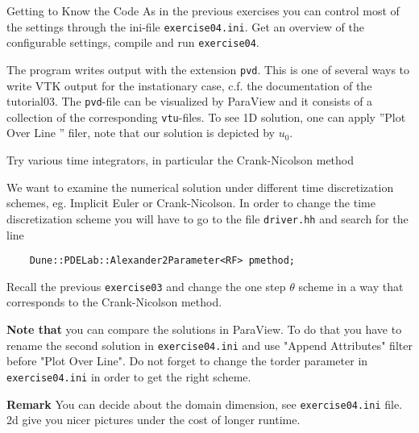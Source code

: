\documentclass[12pt,a4paper]{article}
\begin{document}
\begin{Exercise}{Getting to Know the Code}
  As in the previous exercises you can control most of the settings
  through the ini-file \lstinline!exercise04.ini!. Get an overview of
  the configurable settings, compile and run \lstinline!exercise04!.

  The program writes output with the extension \lstinline!pvd!. This is one
  of several ways to write VTK output for the instationary case,
  c.f. the documentation of the tutorial03. The \lstinline!pvd!-file can
  be visualized by ParaView and it consists of a collection of the
  corresponding \lstinline!vtu!-files. To see 1D solution, one can apply ''Plot Over Line '' filer, note that our solution is depicted by $u_0$.

\end{Exercise}

\begin{Exercise}{ Try various time integrators, in particular the Crank-Nicolson method}

  We want to examine the numerical solution under different time
  discretization schemes, eg. Implicit Euler or Crank-Nicolson. In order to change the time discretization   scheme you will have to go to the file \lstinline!driver.hh! and
  search for the line
  \begin{lstlisting}
    Dune::PDELab::Alexander2Parameter<RF> pmethod;
  \end{lstlisting}
  
 Recall the previous \lstinline!exercise03! and change the one 
 step $\theta$ scheme in a way that corresponds to the Crank-Nicolson method.
 
  \textbf{Note that} you can compare the solutions in ParaView. To do that you have to rename the second solution in \lstinline!exercise04.ini! and use "Append Attributes" filter before "Plot Over Line". Do not forget to change the torder parameter  in \lstinline!exercise04.ini! in order to get the right scheme.
  
  
\end{Exercise}


 \textbf{Remark} You can decide about the domain dimension, see \lstinline!exercise04.ini! file. 2d give you nicer pictures under the cost of longer runtime.  
\end{document}
